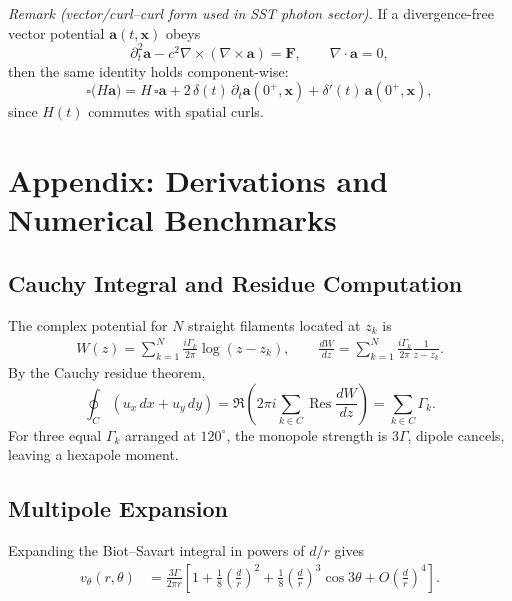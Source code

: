 \documentclass[reprint,aps,onecolumn,nofootinbib]{revtex4-2}
\begin{document}
        \emph{Remark (vector/curl–curl form used in SST photon sector).}
        If a divergence-free vector potential $\mathbf{a}(t,\mathbf{x})$ obeys
        \[
            \partial_t^2 \mathbf{a} - c^2 \nabla\times(\nabla\times \mathbf{a}) = \mathbf{F},\qquad \nabla\!\cdot\!\mathbf{a}=0,
        \]
        then the same identity holds component-wise:
        \[
            \square\!\big(H\mathbf{a}\big) = H\,\square\mathbf{a} + 2\,\delta(t)\,\partial_t \mathbf{a}(0^+,\mathbf{x}) + \delta'(t)\,\mathbf{a}(0^+,\mathbf{x}),
        \]
        since $H(t)$ commutes with spatial curls.

        \appendix
    \section{Appendix: Derivations and Numerical Benchmarks}
    \label{app:three-swirl-derivations}

    \subsection{Cauchy Integral and Residue Computation}
        The complex potential for $N$ straight filaments located at $z_k$ is
        \begin{align}
        W(z)=\sum_{k=1}^{N}\frac{i\Gamma_k}{2\pi}\log(z-z_k),
        \qquad
        \frac{dW}{dz}=\sum_{k=1}^{N}\frac{i\Gamma_k}{2\pi}\frac{1}{z-z_k}.
        \end{align}
        By the Cauchy residue theorem,
        \[
            \oint_{C} (u_x\,dx+u_y\,dy)
            =\Re\!\left(2\pi i\sum_{k\in C}\operatorname{Res}\frac{dW}{dz}\right)
            =\sum_{k\in C}\Gamma_k.
        \]
        For three equal $\Gamma_k$ arranged at $120^\circ$, the monopole strength is $3\Gamma$,
        dipole cancels, leaving a hexapole moment.

    \subsection{Multipole Expansion}
        Expanding the Biot--Savart integral in powers of $d/r$ gives
        \begin{align}
        v_\theta(r,\theta)
        &=\frac{3\Gamma}{2\pi r}\left[1+\frac{1}{8}\!\left(\frac{d}{r}\right)^2
        +\frac{1}{8}\!\left(\frac{d}{r}\right)^3\cos3\theta+O\!\left(\frac{d}{r}\right)^4\right].
        \end{align}
\end{document}

